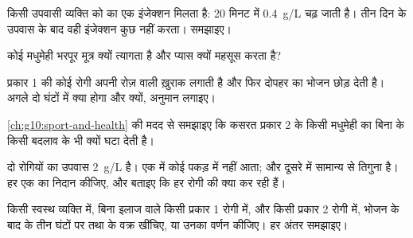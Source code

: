 \begin{exercise}[$\star\star$]\label{exo:g12:glucose-and-diabetes:8}
किसी उपवासी व्यक्ति को  का एक इंजेक्शन मिलता है:  20
मिनट में \qty{0.4}{g/L} चढ़ जाती है। तीन दिन के उपवास के बाद वही इंजेक्शन
कुछ नहीं करता। समझाइए।
\end{exercise}

\begin{exercise}[$\star\star$]\label{exo:g12:glucose-and-diabetes:9}
कोई मधुमेही भरपूर मूत्र क्यों त्यागता है और प्यास क्यों महसूस करता है?
\end{exercise}

\begin{exercise}[$\star\star$]\label{exo:g12:glucose-and-diabetes:10}
प्रकार 1 की कोई रोगी अपनी रोज़ वाली  ख़ुराक लगाती है और फिर दोपहर का
भोजन छोड़ देती है। अगले दो घंटों में क्या होगा और क्यों, अनुमान लगाइए।
\end{exercise}

\begin{exercise}[$\star\star$]\label{exo:g12:glucose-and-diabetes:11}
\cref{ch:g10:sport-and-health} की मदद से समझाइए कि कसरत प्रकार 2 के किसी
मधुमेही का  बिना  के किसी बदलाव के भी क्यों घटा देती है।
\end{exercise}

\begin{exercise}[$\star\star\star$]\label{exo:g12:glucose-and-diabetes:12}
दो रोगियों का उपवास  \qty{2}{g/L} है। एक में कोई  पकड़ में
नहीं आता; और दूसरे में सामान्य से तिगुना  है। हर एक का निदान कीजिए,
और बताइए कि हर रोगी की  क्या कर रही हैं।
\end{exercise}

\begin{exercise}[$\star\star\star$]\label{exo:g12:glucose-and-diabetes:13}
किसी स्वस्थ व्यक्ति में, बिना इलाज वाले किसी प्रकार 1 रोगी में, और किसी
प्रकार 2 रोगी में, भोजन के बाद के तीन घंटों पर  तथा  के
वक्र खींचिए, या उनका वर्णन कीजिए। हर अंतर समझाइए।
\end{exercise}

